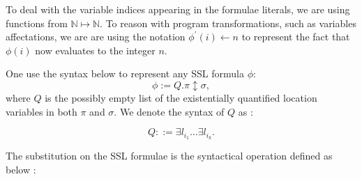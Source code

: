 \documentclass[a4paper,twoside,12pt]{report}
\newcommand{\Formula}[2]{ #1  \updownarrow #2}
\begin{document}
To deal with the variable indices appearing in the formulae literals, we are using functions from 
$\mathbb{N} \mapsto \mathbb{N}$. To reason with program transformations, such
as variables affectations, we are  are using the notation $\phi^{\prime}(i) \leftarrow n$ to represent the fact that $\phi(i)$ now evaluates to the integer $n$.

One use the syntax below to represent any SSL formula $\phi$:
$$
\phi := Q. \Formula{\pi}{\sigma},
$$ 
where $Q$ is the possibly empty list of the existentially quantified location 
variables in both $\pi$ and $\sigma$. We denote the syntax of $Q$ as :

$$Q ::= \exists l_{i_1} \ldots \exists l_{i_k}.$$


\begin{definition}[Substitution]
The substitution on the SSL formulae is the syntactical operation defined as below :


\end{definition}
\end{document}
